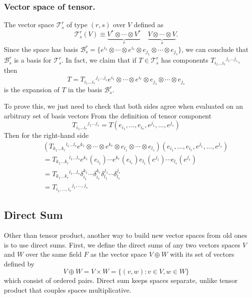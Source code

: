 \documentclass[../../../main.tex]{subfiles}
\begin{document}
\subsubsection{Vector space of tensor.}
The vector space $\mathcal{T}_s^r$ of type $(r,s)$ over $V$ defined as
\begin{equation*}
  \mathcal{T}_s^r(V) \equiv \underbrace{V^* \otimes \cdots \otimes V^*}_{r } \quad \underbrace{V \otimes \cdots \otimes V}_{s }.
\end{equation*}
Since the space has basis $\mathcal{B}^r_s = \{ e^{i_1} \otimes \cdots \otimes e^{i_r} \otimes e_{j_1} \otimes \cdots \otimes e_{j_s} \}$, we can conclude that $\mathcal{B}^r_s$ is a basis for $\mathcal{T}^r_s$.
In fact, we claim that if $T \in \mathcal{T}^r_s$ has components $T_{i_1 \ldots i_r}{}^{j_1 \ldots j_s}$, then
\begin{equation*}
  T = T_{i_1 \ldots i_r}{}^{j_1 \ldots j_s} e^{i_1} \otimes \cdots \otimes e^{i_r} \otimes e_{j_1} \otimes \cdots \otimes e_{j_s}
\end{equation*}
is the expansion of $T$ in the basis $\mathcal{B}^r_s$.

To prove this, we just need to check that both sides agree when evaluated on an arbitrary set of basis vectors
From the definition of tensor component
\begin{equation*}
  T_{i_{1}...i_{r}}{}^{j_{1}...j_{s}} = T(e_{i_{1}},...,e_{i_{r}},e^{j_{1}},...,e^{j_{s}})
\end{equation*}
Then for the right-hand side
\begin{align*}
         & (T_{k_1 \ldots k_r}{}^{l_1 \ldots l_s} e^{k_1} \otimes \cdots \otimes e^{k_r} \otimes e_{l_1} \otimes \cdots \otimes e_{l_s}) \left( e_{i_1}, \ldots, e_{i_r}, e^{j_1}, \ldots, e^{j_s} \right) \\
  \qquad & =  T_{k_1 \ldots k_r}{}^{l_1 \ldots l_s} e^{k_1}(e_{i_1}) \cdots e^{k_r}(e_{i_r}) e_{l_1}(e^{j_1}) \cdots e_{l_s}(e^{j_s})                                                                      \\
  \qquad & =  T_{k_1 \ldots k_r}{}^{l_1 \ldots l_s} \delta_{i_1}^{k_1} \cdots \delta_{i_r}^{k_r} \delta_{l_1}^{j_1} \cdots \delta_{l_s}^{j_s}                                                              \\
  \qquad & =  T_{i_1, \ldots, i_r}{}^{j_1, \ldots, j_s}
\end{align*}

\subsection{Direct Sum}
Other than tensor product, another way to build new vector spaces from old ones is to use direct sums.
First, we define the direct sums of any two vectors spaces $V$ and $W$ over the same field $F$ as the vector space $V \oplus W$ with its set of vectors defined by
\[
  V \oplus W = V \times W = \{(v, w) : v \in V, w \in W\}
\]
which consist of ordered pairs.
Direct sum  keeps spaces separate, unlike tensor product that couples spaces multiplicative.
\end{document}
